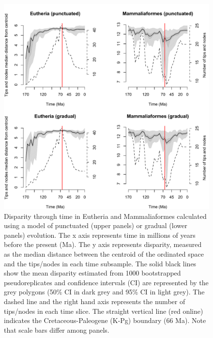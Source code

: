 \documentclass[12pt,letterpaper]{article}
\begin{document}
\begin{figure}[!htbp]
\centering
    \includegraphics[keepaspectratio=true]{Figures/Main_results.pdf}
\caption{\scriptsize{Disparity through time in Eutheria and Mammaliaformes calculated using a model of punctuated (upper panels) or gradual (lower panels) evolution. The x axis represents time in millions of years before the present (Ma). The y axis represents disparity, measured as the median distance between the centroid of the ordinated space and the tips/nodes in each time subsample. The solid black lines show the mean disparity estimated from 1000 bootstrapped pseudoreplicates and confidence intervals (CI) are represented by the grey polygons (50\% CI in dark grey and 95\% CI in light grey). The dashed line and the right hand axis represents the number of tips/nodes in each time slice. The straight vertical line (red online) indicates the Cretaceous-Paleogene (K-Pg) boundary (66 Ma). Note that scale bars differ among panels.}}
\label{fig:Fig_Raw_results}
\end{figure}

\end{document}
